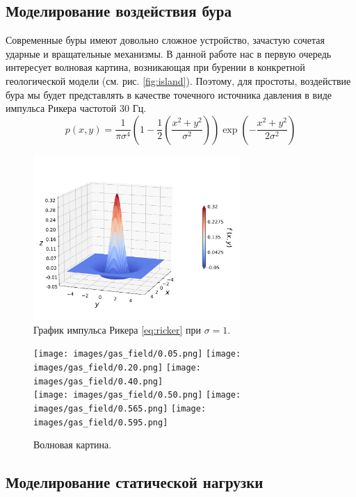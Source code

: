 \subsection{Моделирование воздействия бура}

Современные буры имеют довольно сложное устройство, зачастую сочетая ударные и вращательные механизмы. В данной работе нас в первую очередь интересует волновая картина, возникающая при бурении в конкретной геологической модели (см. рис. \autoref{fig:island}). Поэтому, для простоты, воздействие бура мы будет представлять в качестве точечного источника давления в виде импульса Рикера частотой 30 Гц.
\begin{equation}
    p(x,y) = \dfrac{1}{\pi \sigma^4} \left(1-\dfrac{1}{2}\left(\dfrac{x^2+y^2}{\sigma^2}\right)\right) \exp\left({-\frac{x^2+y^2}{2\sigma^2}}\right)
    \label{eq:ricker}
\end{equation}

\begin{figure}[htb]
    \centering
    \includegraphics[trim={0pt 45pt 0pt 80pt},clip,width=0.7\textwidth]{images/gas_field/ricker_wavelet.png}
    \caption{График импульса Рикера \eqref{eq:ricker} при $\sigma=1$.}
    \label{fig:ricker_plot}
\end{figure}

\begin{figure}[H]
    \centering
    \texttt{[image: images/gas\_field/0.05.png]}
    \texttt{[image: images/gas\_field/0.20.png]}
    \texttt{[image: images/gas\_field/0.40.png]}\\
    \texttt{[image: images/gas\_field/0.50.png]}
    \texttt{[image: images/gas\_field/0.565.png]}
    \texttt{[image: images/gas\_field/0.595.png]}
    \caption{Волновая картина.}
    \label{fig:wave_image}
\end{figure}

\subsection{Моделирование статической нагрузки}

